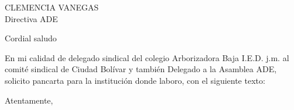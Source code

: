 \documentclass[letterpaper,spanish,11pt]{letter}
\date{16 de marzo de 2015}
\begin{document}
\begin{letter}{CLEMENCIA VANEGAS\\Directiva ADE}
	
\opening{Cordial saludo}
En mi calidad de delegado sindical del colegio Arborizadora Baja  I.E.D. j.m. al comité sindical de Ciudad Bolívar y también Delegado a la Asamblea ADE, solicito pancarta para la institución donde laboro, con el siguiente texto:\\

\closing{Atentamente,}


\end{letter}
\end{document}
